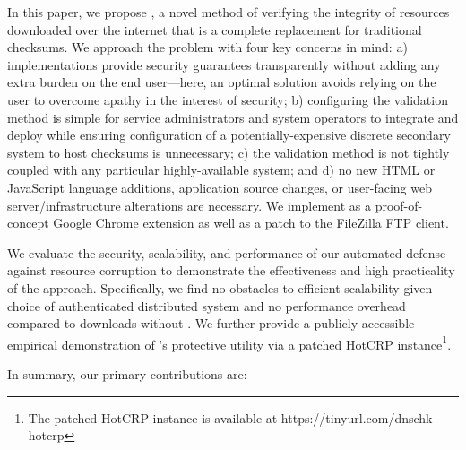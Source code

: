 In this paper, we propose \SYSTEM{}, a novel method of verifying the integrity
of resources downloaded over the internet that is a complete replacement for
traditional checksums. We approach the problem with four key concerns in mind:
a) implementations provide security guarantees transparently without adding any
extra burden on the end user---here, an optimal solution avoids relying on the
user to overcome apathy in the interest of security; b) configuring the
validation method is simple for service administrators and system operators to
integrate and deploy while ensuring configuration of a potentially-expensive
discrete secondary system to host checksums is unnecessary; c) the validation
method is not tightly coupled with any particular highly-available system; and
d) no new HTML or JavaScript language additions, application source changes, or
user-facing web server/infrastructure alterations are necessary. We implement
\SYSTEM{} as a proof-of-concept Google Chrome extension as well as a patch to
the FileZilla FTP client.

We evaluate the security, scalability, and performance of our automated defense
against resource corruption to demonstrate the effectiveness and high
practicality of the \SYSTEM{} approach. Specifically, we find no obstacles to
efficient scalability given choice of authenticated distributed system and no
performance overhead compared to downloads without \SYSTEM{}. We further provide
a publicly accessible empirical demonstration of \SYSTEM{}'s protective utility
via a patched HotCRP instance\footnote{The patched HotCRP instance is available
at https://tinyurl.com/dnschk-hotcrp}.

In summary, our primary contributions are:

